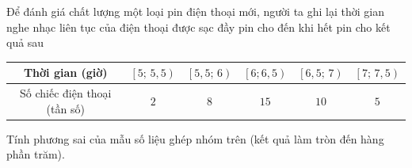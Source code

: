 \begin{bt}%

	Để đánh giá chất lượng một loại pin điện thoại mới, người ta ghi lại thời gian nghe nhạc liên tục của điện thoại được sạc đầy pin cho đến khi hết pin cho kết quả sau
	\begin{center}
		\begin{tabular}{|c|c|c|c|c|c|} 
			\hline 
			Thời gian (giờ) & $\left[5;\,5{,}5\right)$ & $\left[5{,}5;\,6\right)$ & $\left[6;6{,}5\right)$ & $\left[6{,}5;\,7\right)$ & $\left[7;\,7{,}5\right)$ \\ 
			\hline 
			Số chiếc điện thoại (tần số) & $2$ & $8$ & $15$ & $10$& $5$\\ 
			\hline 
		\end{tabular}		
	\end{center}
	Tính phương sai của mẫu số liệu ghép nhóm trên (kết quả làm tròn đến hàng phần trăm).
\end{bt}


